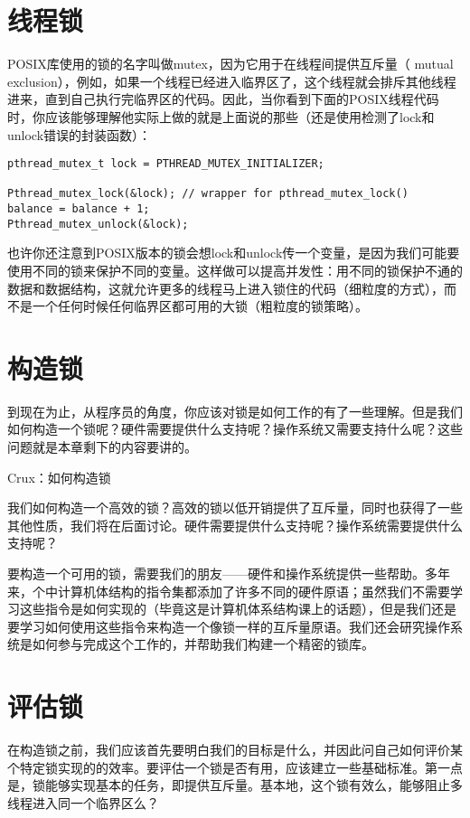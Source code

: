 \section{线程锁}
POSIX库使用的锁的名字叫做mutex，因为它用于在线程间提供互斥量（ mutual exclusion），例如，如果一个线程已经进入临界区了，这个线程就会排斥其他线程进来，直到自己执行完临界区的代码。因此，当你看到下面的POSIX线程代码时，你应该能够理解他实际上做的就是上面说的那些（还是使用检测了lock和unlock错误的封装函数）：
\begin{verbatim}
pthread_mutex_t lock = PTHREAD_MUTEX_INITIALIZER;

Pthread_mutex_lock(&lock); // wrapper for pthread_mutex_lock()
balance = balance + 1;
Pthread_mutex_unlock(&lock);
\end{verbatim}

也许你还注意到POSIX版本的锁会想lock和unlock传一个变量，是因为我们可能要使用不同的锁来保护不同的变量。这样做可以提高并发性：用不同的锁保护不通的数据和数据结构，这就允许更多的线程马上进入锁住的代码（细粒度的方式），而不是一个任何时候任何临界区都可用的大锁（粗粒度的锁策略）。


\section{构造锁}
到现在为止，从程序员的角度，你应该对锁是如何工作的有了一些理解。但是我们如何构造一个锁呢？硬件需要提供什么支持呢？操作系统又需要支持什么呢？这些问题就是本章剩下的内容要讲的。

\begin{tcolorbox}[colframe=grey,colback= grey,arc=0pt,left=6pt,right=6pt,top=6pt,bottom=6pt,boxsep=0pt]
\begin{center}Crux：如何构造锁\end{center}
我们如何构造一个高效的锁？高效的锁以低开销提供了互斥量，同时也获得了一些其他性质，我们将在后面讨论。硬件需要提供什么支持呢？操作系统需要提供什么支持呢？
\end{tcolorbox}

要构造一个可用的锁，需要我们的朋友——硬件和操作系统提供一些帮助。多年来，个中计算机体结构的指令集都添加了许多不同的硬件原语；虽然我们不需要学习这些指令是如何实现的（毕竟这是计算机体系结构课上的话题），但是我们还是要学习如何使用这些指令来构造一个像锁一样的互斥量原语。我们还会研究操作系统是如何参与完成这个工作的，并帮助我们构建一个精密的锁库。


\section{评估锁}
在构造锁之前，我们应该首先要明白我们的目标是什么，并因此问自己如何评价某个特定锁实现的的效率。要评估一个锁是否有用，应该建立一些基础标准。第一点是，锁能够实现基本的任务，即提供互斥量。基本地，这个锁有效么，能够阻止多线程进入同一个临界区么？

